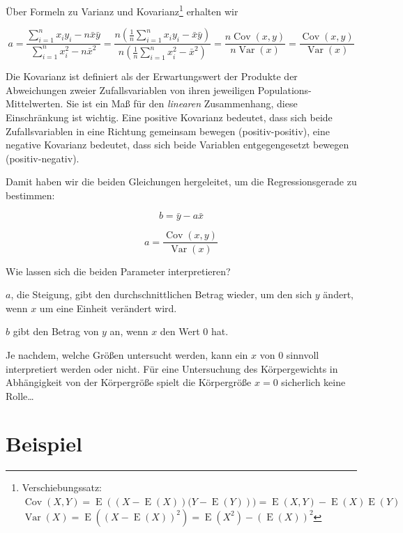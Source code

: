 \documentclass[ngerman, 12pt,parskip=half]{scrartcl}
\def\sm{\sum\limits_{i=1}^{n}}
\DeclareMathOperator{\cov}{Cov}
\DeclareMathOperator{\var}{Var}
\DeclareMathOperator{\E}{E}
\begin{document}
Über Formeln zu Varianz und Kovarianz\footnote{Verschiebungssatz: \\ $\cov(X,Y) = \E \left((X - \E(X))(Y - \E(Y)\right)) =\E(X,Y)- \E(X)\E(Y)$ \\ $\var(X)=\E\left(\left(X-\E(X)\right)^2\right)=\E(X^2)-\left(\E(X)\right)^2$} erhalten wir

\begin{equation}
a =  \dfrac{\sm x_iy_i - n\bar{x}\bar{y}}{\sm x_i^2 -n\bar{x}^2} = \dfrac{n \left(\frac{1}{n}\sm x_iy_i - \bar{x}\bar{y}\right)}{ n\left( \frac{1}{n}\sm x_i^2 -\bar{x}^2\right)}  = \dfrac{n\cov(x,y)}{n\var(x)} = \dfrac{\cov(x,y)}{\var(x)}
\end{equation}

 
\begin{infobox}
Die Kovarianz ist definiert als der Erwartungswert der Produkte der Abweichungen zweier Zufallsvariablen von ihren jeweiligen Populations-Mittelwerten. 
Sie ist ein Maß für den \textit{linearen} Zusammenhang, diese Einschränkung ist wichtig.
Eine positive Kovarianz bedeutet, dass sich beide Zufallsvariablen in eine Richtung gemeinsam bewegen (positiv-positiv), eine negative Kovarianz bedeutet, dass sich beide Variablen entgegengesetzt bewegen (positiv-negativ).
\end{infobox}


Damit haben wir die beiden Gleichungen hergeleitet, um die Regressionsgerade zu bestimmen:

\begin{equation}
b=\bar{y} - a \bar{x}
\end{equation}


\begin{equation}
a =  \dfrac{\cov(x,y)}{\var(x)}
\end{equation}

Wie lassen sich die beiden Parameter interpretieren? 

\(a\), die Steigung, gibt den durchschnittlichen Betrag wieder, um den sich \(y\) ändert, wenn \(x\) um eine Einheit verändert wird. 

\(b\) gibt den Betrag von \(y\) an, wenn \(x\) den Wert 0 hat. 

Je nachdem, welche Größen untersucht werden, kann ein \(x\) von 0 sinnvoll interpretiert werden oder nicht. Für eine Untersuchung des  Körpergewichts in Abhängigkeit von der Körpergröße spielt die Körpergröße \(x=0\) sicherlich keine Rolle\ldots    

\section{Beispiel}
\end{document}
